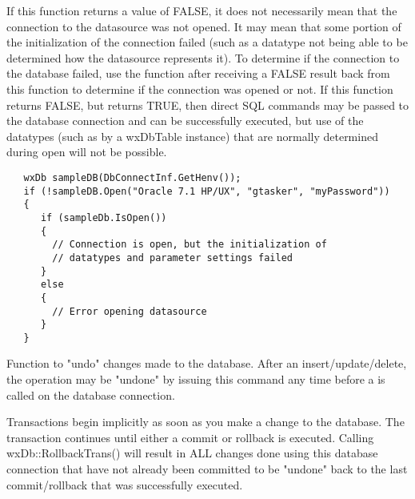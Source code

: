 If this function returns a value of FALSE, it does not necessarily mean that 
the connection to the datasource was not opened.  It may mean that some 
portion of the initialization of the connection failed (such as a datatype not 
being able to be determined how the datasource represents it).  To determine 
if the connection to the database failed, use the  
function after receiving a FALSE result back from this function to determine if 
the connection was opened or not.  If this function returns FALSE, but  
returns TRUE, then direct SQL commands may be passed to the database 
connection and can be successfully executed, but use of the datatypes (such as 
by a wxDbTable instance) that are normally determined during open will not be 
possible.



\begin{verbatim}
   wxDb sampleDB(DbConnectInf.GetHenv());
   if (!sampleDB.Open("Oracle 7.1 HP/UX", "gtasker", "myPassword"))
   {
      if (sampleDb.IsOpen())
      {
        // Connection is open, but the initialization of 
        // datatypes and parameter settings failed
      }
      else
      {
        // Error opening datasource
      }
   }
\end{verbatim}


\label{wxdbrollbacktrans}


Function to "undo" changes made to the database.  After an insert/update/delete, the operation may be "undone" by issuing this command any time before a  is called on the database connection.


Transactions begin implicitly as soon as you make a change to the database.  The 
transaction continues until either a commit or rollback is executed.  Calling 
wxDb::RollbackTrans() will result in ALL changes done using this database 
connection that have not already been committed to be "undone" back to the last 
commit/rollback that was successfully executed.

